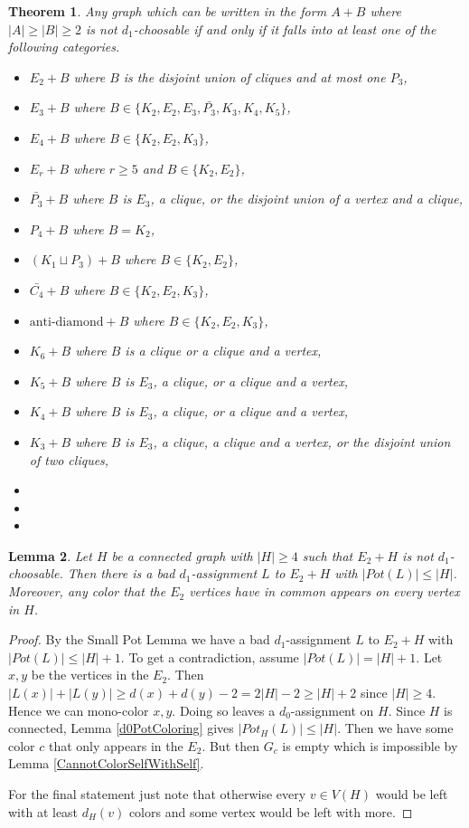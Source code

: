\documentclass[12pt]{article}
\theoremstyle{plain}
\newtheorem{thm}{Theorem}[section]
\newtheorem{lem}[thm]{Lemma}
\theoremstyle{definition}
\theoremstyle{remark}
\begin{document}
\begin{thm}
Any graph which can be written in the form $A+B$ where $|A| \geq |B| \geq 2$ is not $d_1$-choosable if and only if it falls into at least one of the following categories.

\begin{itemize}
\item $E_2 + B$ where $B$ is the disjoint union of cliques and at most one $P_3$,
\item $E_3 + B$ where $B \in \{K_2,E_2,E_3,\bar{P_3},K_3,K_4,K_5\}$,
\item $E_4 + B$ where $B \in \{K_2, E_2, K_3\}$,
\item $E_r + B$ where $r \geq 5$ and  $B \in \{K_2, E_2\}$,
\item $\bar{P_3} + B$ where $B$ is $E_3$, a clique, or the disjoint union of a vertex and a clique,
\item $P_4 + B$ where $B = K_2$,
\item $(K_1 \sqcup P_3) + B$ where $B \in \{K_2, E_2\}$,
\item $\bar{C_4} + B$ where $B \in \{K_2, E_2, K_3\}$,
\item $\text{anti-diamond} + B$ where $B \in \{K_2, E_2, K_3\}$,
\item $K_6 + B$ where $B$ is a clique or a clique and a vertex,
\item $K_5 + B$ where $B$ is $E_3$, a clique, or a clique and a vertex,
\item $K_4 + B$ where $B$ is $E_3$, a clique, or a clique and a vertex, 
\item $K_3 + B$ where $B$ is $E_3$, a clique, a clique and a vertex, or the disjoint union of two cliques,
\item
\item
\item
\end{itemize}
\end{thm}

\begin{lem}\label{E2SmallerPot}
Let $H$ be a connected graph with $|H| \geq 4$ such that $E_2 + H$ is not $d_1$-choosable. Then there is a bad $d_1$-assignment $L$ to $E_2 + H$ with $|Pot(L)| \leq |H|$.  Moreover, any color that the $E_2$ vertices have in common appears on every vertex in $H$.
\end{lem}
\begin{proof}
By the Small Pot Lemma we have a bad $d_1$-assignment $L$ to $E_2 + H$ with $|Pot(L)| \leq |H| + 1$.  To get a contradiction, assume $|Pot(L)| = |H| + 1$. Let $x,y$ be the vertices in the $E_2$.  Then $|L(x)| + |L(y)| \geq d(x) + d(y) - 2 = 2|H| - 2 \geq |H| + 2$ since $|H| \geq 4$.  Hence we can mono-color $x,y$.  Doing so leaves a $d_0$-assignment on $H$.  Since $H$ is connected, Lemma \ref{d0PotColoring} gives $|Pot_H(L)| \leq |H|$.  Then we have some color $c$ that only appears in the $E_2$.  But then $G_c$ is empty which is impossible by Lemma \ref{CannotColorSelfWithSelf}.\newline

For the final statement just note that otherwise every $v \in V(H)$ would be left with at least $d_H(v)$ colors and some vertex would be left with more.
\end{proof}
\end{document}
